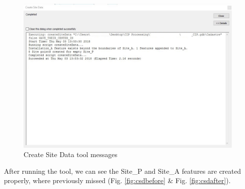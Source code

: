 \documentclass[openany]{book}
\theoremstyle{definition}
\theoremstyle{definition}
\theoremstyle{definition}
\theoremstyle{remark}
\begin{document}
\begin{figure}[H]

{\centering \includegraphics{figures/csd-messages} 

}

\caption{Create Site Data tool messages}\label{fig:csdmessages}
\end{figure}

After running the tool, we can see the Site\_P and Site\_A features are
created properly, where previously missed (Fig. \ref{fig:csdbefore} \&
Fig. \ref{fig:csdafter}).
\end{document}
